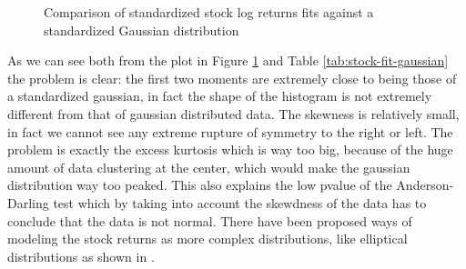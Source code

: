 \begin{table}[htb]
\centering
{}
\caption{Descriptive statics and results of fit of stock returns against a standardized Gaussian distribution.}
\label{tab:stock-fit-gaussian}
\end{table}

\begin{figure}[htb]
\centering

\caption{Comparison of standardized stock log returns fits against a standardized Gaussian distribution}
\label{fig:stock-returns-normal}
\end{figure}

As we can see both from the plot in Figure \ref{fig:stock-returns-normal} and Table \ref{tab:stock-fit-gaussian} the problem is clear: the first two moments are extremely close to being those of a standardized gaussian, in fact the shape of the histogram is not extremely different from that of gaussian distributed data. The skewness is relatively small, in fact we cannot see any extreme rupture of symmetry to the right or left. The problem is exactly the excess kurtosis which is way too big, because of the huge amount of data clustering at the center, which would make the gaussian distribution way too peaked. This also explains the low pvalue of the Anderson-Darling test which by taking into account the skewdness of the data has to conclude that the data is not normal. There have been proposed ways of modeling the stock returns as more complex distributions, like elliptical distributions as shown in \cite{risk-parity-hard}.




